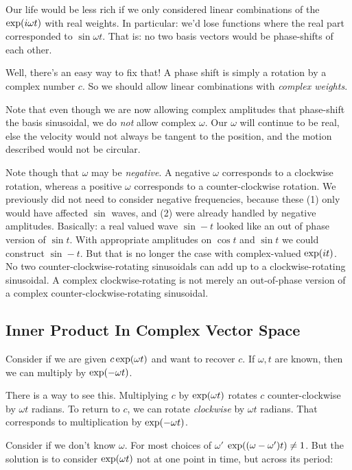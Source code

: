 Our life would be less rich if we only considered linear combinations of
the $\exp\mathopen{}\left( {i \omega t} \right)\mathclose{}$ with real weights. In particular: we'd lose
functions where the real part corresponded to $\sin \omega t$. That is:
no two basis vectors would be phase-shifts of each other.

Well, there's an easy way to fix that! A phase shift is simply a
rotation by a complex number $c$. So we should allow linear combinations
with \emph{complex weights}.

Note that even though we are now allowing complex amplitudes that
phase-shift the basis sinusoidal, we do \emph{not} allow complex
$\omega$. Our $\omega$ will continue to be real, else the velocity would
not always be tangent to the position, and the motion described would
not be circular.

Note though that $\omega$ may be \emph{negative}. A negative $\omega$
corresponds to a clockwise rotation, whereas a positive $\omega$
corresponds to a counter-clockwise rotation. We previously did not need
to consider negative frequencies, because these (1) only would have
affected $\sin$ waves, and (2) were already handled by negative
amplitudes. Basically: a real valued wave $\sin -t$ looked like an out
of phase version of $\sin t$. With appropriate amplitudes on $\cos t$
and $\sin t$ we could construct $\sin -t$. But that is no longer the
case with complex-valued $\exp\mathopen{}\left( {it} \right)\mathclose{}$. No two counter-clockwise-rotating
sinusoidals can add up to a clockwise-rotating sinusoidal. A complex
clockwise-rotating is not merely an out-of-phase version of a complex
counter-clockwise-rotating sinusoidal.

\subsection{Inner Product In Complex Vector Space}

Consider if we are given $c \exp\mathopen{}\left( {\omega t} \right)\mathclose{}$ and want to recover $c$. If
$\omega, t$ are known, then we can multiply by $\exp\mathopen{}\left( {-\omega t} \right)\mathclose{}$.

There is a way to see this. Multiplying $c$ by $\exp\mathopen{}\left( {\omega t} \right)\mathclose{}$ rotates
$c$ counter-clockwise by $\omega t$ radians. To return to $c$, we can
rotate \emph{clockwise} by $\omega t$ radians. That corresponds to
multiplication by $\exp\mathopen{}\left( {-\omega t} \right)\mathclose{}$.

Consider if we don't know $\omega$. For most choices of $\omega'$
$\exp\mathopen{}\left( {\mathopen{}\left( {\omega - \omega'} \right)\mathclose{} t} \right)\mathclose{} \ne 1$. But the solution is to
consider $\exp\mathopen{}\left( {\omega t} \right)\mathclose{}$ not at one point in time, but across its
period:

